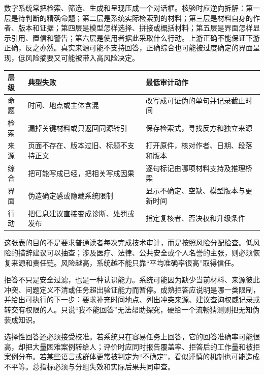 数字系统常把检索、筛选、生成和呈现压成一个对话框。核验时应逆向拆解：第一层是待判断的精确命题；第二层是系统实际检索到的材料；第三层是材料自身的作者、版本和证据；第四层是模型怎样选择、拼接或概括材料；第五层是界面怎样显示引用、置信和警告；第六层是使用者据此采取什么行动。上游正确不能保证下游正确，反之亦然。真实来源可能不支持回答，正确综合也可能被过度确定的界面呈现，低风险摘要又可能被带入高风险决定。

\begin{center}
\begin{tabularx}{\textwidth}{p{}p{}X}
\toprule
层级 & 典型失败 & 最低审计动作\\
\midrule
命题 & 时间、地点或主体含混 & 改写成可证伪的单句并记录截止时间\\
检索 & 漏掉关键材料或只返回同源转引 & 保存检索式，寻找反方和独立来源\\
来源 & 页面不存在、版本过旧、标题不支持正文 & 打开原件，核对作者、日期、段落和版本\\
综合 & 把可能写成已经，把相关写成因果 & 逐句标记由哪项材料支持及推理桥梁\\
界面 & 伪造确定感或隐藏系统限制 & 显示不确定、空缺、模型版本与更新时间\\
行动 & 把信息建议直接变成诊断、处罚或发布 & 指定复核者、否决权和升级条件\\
\bottomrule
\end{tabularx}
\end{center}

这张表的目的不是要求普通读者每次完成技术审计，而是按照风险分配检查。低风险的措辞建议可以抽查；涉及医疗、法律、公共安全或个人名誉的主张，则必须恢复来源和责任链。风险越高，系统越不能只靠“平均准确率很高”取得信任。

拒答不只是安全过滤，也是一种认识能力。系统可能因为缺少当前材料、来源彼此冲突、问题定义不清或任务超出验证能力而暂停。成熟拒答应说明是哪一类限制，并给出可执行的下一步：要求补充时间地点、列出冲突来源、建议查询权威记录或转交有权限的人。只说“我不能回答”无法帮助探究，硬给一个流畅猜测则把无知伪装成知识。

选择性回答还必须接受校准。若系统只在容易任务上回答，它的回答准确率可能很高，却把大量困难案例转给人；评价时应同时报告覆盖率、拒答后的工作量和被拒案例分布。若某些语言或群体更常被判定为“不确定”，看似谨慎的机制也可能造成不平等。总指标必须与分组失效和实际后果共同审查\parencite{buolamwini2018,nist2024}。

